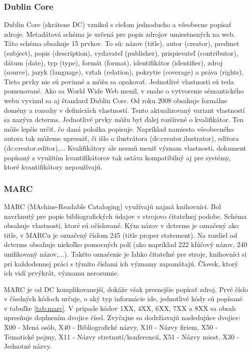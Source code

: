 \documentclass[thesis=M,slovak]{FITthesis}[2013/05/06]
\begin{document}
\subsubsection{Dublin Core}
Dublin Core (skrátene DC) vznikol s cieľom jednoducho a všeobecne popísať zdroje. Metadátová schéma je určená pre popis zdrojov umiestnených na web. Táto schéma obsahuje 15 prvkov. To sú: názov (title), autor (creator), predmet (subject), popis (description), vydavateľ (publisher), prispievateľ (contributor), dátum (date), typ (type), formát (format), identifikátor (identifier), zdroj (source), jazyk (language), vzťah (relation), pokrytie (coverage) a práva (rights). \cite[s.~37]{zhang2014creating} Tieto prvky nie sú povinné a môžu sa opakovať. Jednotlivé vlastnosti sú teda pomenované. Ako sa World Wide Web menil, v snahe o vytvorenie sémantického webu vyvinul sa aj štandard Dublin Core. Od roku 2008 obsahuje formálne domény a rozsahy v definíciách vlastností. Tento aktualizovaný variant vlastností sa nazýva dcterms. Jednotlivé prvky môžu byť ďalej rozšírené o kvalifikátor. Ten môže lepšie určiť, čo daná položka popisuje. Napríklad namiesto všeobecného autora tak môžeme upresniť, či išlo o ilustrátora (dc:creator.ilustrator), editora (dc:creator.editor),...  Kvalifikátory ale nesmú meniť význam vlastnosti, dokument popísaný s využitím kvantifikátorov tak ostáva kompatibilný aj pre systémy, ktoré kvantifikátory nepoužívajú.\cite[s.~295]{witten2009build}

\subsubsection{MARC}
MARC (MAchine-Readable Cataloging) využívajú najmä knihovníci. Bol navrhnutý pre popis bibliografických údajov v strojovo čitateľnej podobe.
Schéma obsahuje vlastnosti, ktoré sú očíslované. Kým názov v dcterms je označený ako title, v MARCu  je označený číslom 245 (title proper statement). Na rozdiel od dcterms obsahuje niekoľko pomocných polí (ako napríklad 222 kľúčový názov, 240 unifikovaný názov,...).\cite[s.~288-289]{witten2009build} Takéto označenie je ľahko čitateľné pre stroje, knihovníci si pri každodennej práci s týmito číslami ich významy zapamätajú. Človek, ktorý ich vidí prvýkrát, významu nerozumie.

MARC je od DC komplikovanejší, dokáže však presnejšie popísať zdroj.
Prvé číslo v číselných kódoch určuje, o aký typ informácie ide, jednotlivé kódy sú popísané v tabuľke \ref{tab:marc}. V prípade kódov 1XX, 4XX, 6XX, 7XX a 8XX sa obsah upresňuje doplnením dvojice čísel. Zvyčajne sa dodržiavajú nasledujúce dvojice: X00 - Mená osôb, X40 - Bibliografické názvy, X10 - Názvy firiem, X50 - Tematické pojmy, X11 - Názvy stretnutí/konferencií, X51 - Názvy miest, X30 - Jednotné názvy.
\end{document}
